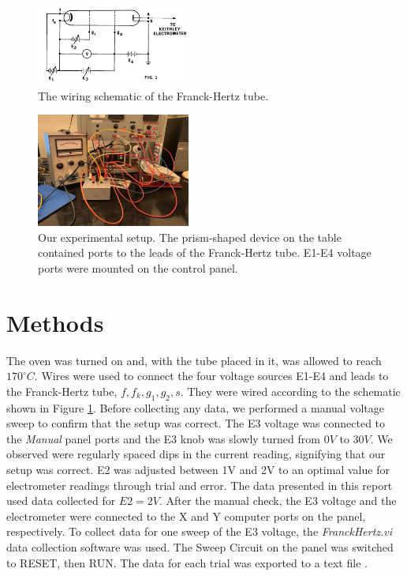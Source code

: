 \documentclass[12pt,twocolumn,letterpaper]{article}
\begin{document}
\begin{figure}
  \centering
  \includegraphics[width=0.45\textwidth]{figures/schematic.PNG}
  \caption{The wiring schematic of the Franck-Hertz tube.}
  \label{schematic}
\end{figure}

\begin{figure}
  \centering
  \includegraphics[width=0.45\textwidth]{figures/setup.PNG}
  \caption{Our experimental setup. The prism-shaped device on the table contained ports to the leads of the Franck-Hertz tube. E1-E4 voltage ports were mounted on the control panel.}
  \label{setup}
\end{figure}

\section{Methods}
The oven was turned on and, with the tube placed in it, was allowed to reach $170^\circ C$. Wires were used to connect the four voltage sources E1-E4 and leads to the Franck-Hertz tube, $f, f_k, g_1, g_2, s$. They were wired according to the schematic shown in Figure \ref{schematic}. Before collecting any data, we performed a manual voltage sweep to confirm that the setup was correct. The E3 voltage was connected to the \textit{Manual} panel ports and the E3 knob was slowly turned from $0V$ to $30V$. We observed were regularly spaced dips in the current reading, signifying that our setup was correct. E2 was adjusted between 1V and 2V to an optimal value for electrometer readings through trial and error. The data presented in this report used data collected for $E2 = 2V$. After the manual check, the E3 voltage and the electrometer were connected to the X and Y computer ports on the panel, respectively. To collect data for one sweep of the E3 voltage, the \textit{FranckHertz.vi} data collection software was used. The Sweep Circuit on the panel was switched to RESET, then RUN. The data for each trial was exported to a text file \cite{labmanual}.
\end{document}
